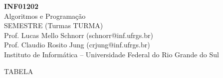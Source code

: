 \documentclass[11pt,portuguese,]{article}
\begin{document}
\clearpage\thispagestyle{empty}

\begin{center}
  {\LARGE     {\bf INF01202} \\
    Algoritmos e Programação \\
    SEMESTRE (Turmas TURMA)} \\
  Prof. Lucas Mello Schnorr (schnorr@inf.ufrgs.br) \\
  Prof. Claudio Rosito Jung (crjung@inf.ufrgs.br) \\
  Instituto de Informática -- Universidade Federal do Rio Grande do Sul
\end{center}

TABELA
\end{document}
